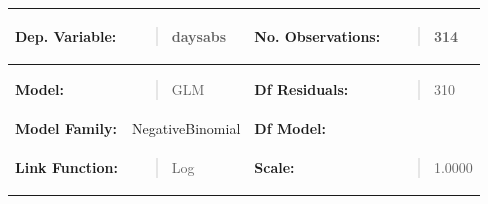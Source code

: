 {\def\LTcaptype{none} %
\begin{longtable}[]{@{}
  >{\raggedright\arraybackslash}p{}
  >{\raggedright\arraybackslash}p{}
  >{\raggedright\arraybackslash}p{}
  >{\raggedright\arraybackslash}p{}@{}}
\toprule\noalign{}
\begin{minipage}[b]{\linewidth}\raggedright
\textbf{Dep. Variable:}
\end{minipage} & \begin{minipage}[b]{\linewidth}\raggedright
\begin{quote}
daysabs
\end{quote}
\end{minipage} & \begin{minipage}[b]{\linewidth}\raggedright
\textbf{No. Observations:}
\end{minipage} & \begin{minipage}[b]{\linewidth}\raggedright
\begin{quote}
314
\end{quote}
\end{minipage} \\
\midrule\noalign{}
\endhead
\bottomrule\noalign{}
\endlastfoot
\textbf{Model:} & \begin{minipage}[t]{\linewidth}\raggedright
\begin{quote}
GLM
\end{quote}
\end{minipage} & \textbf{Df Residuals:} &
\begin{minipage}[t]{\linewidth}\raggedright
\begin{quote}
310
\end{quote}
\end{minipage} \\
\textbf{Model Family:} & NegativeBinomial & \textbf{Df Model:} & 3 \\
\textbf{Link Function:} & \begin{minipage}[t]{\linewidth}\raggedright
\begin{quote}
Log
\end{quote}
\end{minipage} & \textbf{Scale:} &
\begin{minipage}[t]{\linewidth}\raggedright
\begin{quote}
1.0000
\end{quote}
\end{minipage} \\

\end{longtable}}
